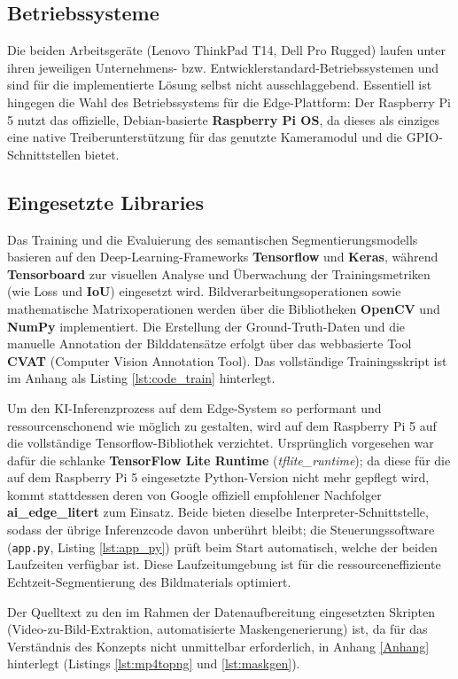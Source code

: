 \subsection{Betriebssysteme}

Die beiden Arbeitsgeräte (Lenovo ThinkPad T14, Dell Pro Rugged) laufen unter ihren jeweiligen Unternehmens- bzw. Entwicklerstandard-Betriebssystemen und sind für die implementierte Lösung selbst nicht ausschlaggebend. Essentiell ist hingegen die Wahl des Betriebssystems für die Edge-Plattform: Der Raspberry Pi 5 nutzt das offizielle, Debian-basierte \textbf{Raspberry Pi OS}, da dieses als einziges eine native Treiberunterstützung für das genutzte Kameramodul und die GPIO-Schnittstellen bietet.

\subsection{Eingesetzte Libraries}

Das Training und die Evaluierung des semantischen Segmentierungsmodells basieren auf den Deep-Learning-Frameworks \textbf{Tensorflow} und \textbf{Keras}, während \textbf{Tensorboard} zur visuellen Analyse und Überwachung der Trainingsmetriken (wie Loss und \textbf{IoU}) eingesetzt wird. Bildverarbeitungsoperationen sowie mathematische Matrixoperationen werden über die Bibliotheken \textbf{OpenCV} und \textbf{NumPy} implementiert. Die Erstellung der Ground-Truth-Daten und die manuelle Annotation der Bilddatensätze erfolgt über das webbasierte Tool \textbf{CVAT} (Computer Vision Annotation Tool). Das vollständige Trainingsskript ist im Anhang als Listing \ref{lst:code_train} hinterlegt.

Um den KI-Inferenzprozess auf dem Edge-System so performant und ressourcenschonend wie möglich zu gestalten, wird auf dem Raspberry Pi 5 auf die vollständige Tensorflow-Bibliothek verzichtet. Ursprünglich vorgesehen war dafür die schlanke \textbf{TensorFlow Lite Runtime} (\textit{tflite\_runtime}); da diese für die auf dem Raspberry Pi 5 eingesetzte Python-Version nicht mehr gepflegt wird, kommt stattdessen deren von Google offiziell empfohlener Nachfolger \textbf{ai\_edge\_litert} zum Einsatz. Beide bieten dieselbe Interpreter-Schnittstelle, sodass der übrige Inferenzcode davon unberührt bleibt; die Steuerungssoftware (\texttt{app.py}, Listing \ref{lst:app_py}) prüft beim Start automatisch, welche der beiden Laufzeiten verfügbar ist. Diese Laufzeitumgebung ist für die ressourceneffiziente Echtzeit-Segmentierung des Bildmaterials optimiert.

Der Quelltext zu den im Rahmen der Datenaufbereitung eingesetzten Skripten (Video-zu-Bild-Extraktion, automatisierte Maskengenerierung) ist, da für das Verständnis des Konzepts nicht unmittelbar erforderlich, in Anhang \ref{Anhang} hinterlegt (Listings \ref{lst:mp4topng} und \ref{lst:maskgen}).





